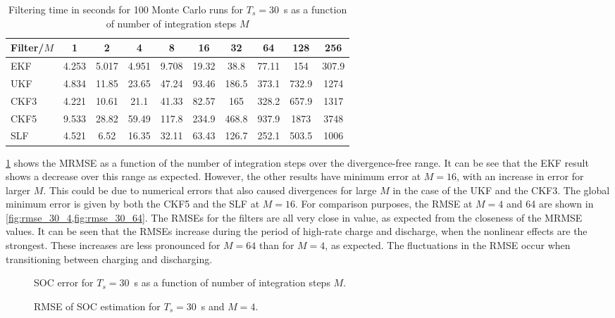 \documentclass[../zhang_thesis.tex]{subfiles}
\begin{document}
\begin{table}[h]
\centering
\caption{Filtering time in seconds for 100 Monte Carlo runs for $T_s=30$~s as a function of number of integration steps $M$}
\begin{tabular}{@{}lccccccccc@{}}
\toprule
Filter/$M$ & 1     & 2     & 4     & 8     & 16    & 32    & 64    & 128   & 256   \\ \midrule
EKF        & 4.253 & 5.017 & 4.951 & 9.708 & 19.32 & 38.8  & 77.11 & 154   & 307.9 \\
UKF        & 4.834 & 11.85 & 23.65 & 47.24 & 93.46 & 186.5 & 373.1 & 732.9 & 1274  \\
CKF3       & 4.221 & 10.61 & 21.1  & 41.33 & 82.57 & 165   & 328.2 & 657.9 & 1317  \\
CKF5       & 9.533 & 28.82 & 59.49 & 117.8 & 234.9 & 468.8 & 937.9 & 1873  & 3748  \\
SLF        & 4.521 & 6.52  & 16.35 & 32.11 & 63.43 & 126.7 & 252.1 & 503.5 & 1006  \\ \bottomrule
\end{tabular}
\label{tab:time_30}
\end{table}

\cref{fig:mrmse_30} shows the MRMSE as a function of the number of integration steps over the divergence-free range. It can be see that the EKF result shows a decrease over this range as expected. However, the other results have minimum error at $M=16$, with an increase in error for larger $M$. This could be due to numerical errors that also caused divergences for large $M$ in the case of the UKF and the CKF3. The global minimum error is given by both the CKF5 and the SLF at $M=16$. For comparison purposes, the RMSE at $M=4$ and 64 are shown in \cref{fig:rmse_30_4,fig:rmse_30_64}. The RMSEs for the filters are all very close in value, as expected from the closeness of the MRMSE values. It can be seen that the RMSEs increase during the period of high-rate charge and discharge, when the nonlinear effects are the strongest. These increases are less pronounced for $M=64$ than for $M=4$, as expected. The fluctuations in the RMSE occur when transitioning between charging and discharging.

\begin{figure}[b]
\centering

\caption{SOC error for $T_s=30$~s as a function of number of integration steps $M$.}
\label{fig:mrmse_30}
\end{figure}

\begin{figure}
\centering

\caption{RMSE of SOC estimation for $T_s=30$~s and $M=4$.}
\label{fig:rmse_30_4}
\end{figure}
\end{document}
